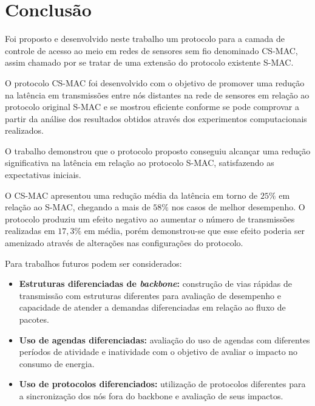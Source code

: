 \section{Conclusão}

Foi proposto e desenvolvido neste trabalho um protocolo para a camada de controle de acesso ao meio em redes de sensores sem fio denominado CS-MAC, assim chamado por se tratar de uma extensão do protocolo existente S-MAC. 

O protocolo CS-MAC foi desenvolvido com o objetivo de promover uma redução na latência em transmissões entre nós distantes na rede de sensores em relação ao protocolo original S-MAC e se mostrou eficiente conforme se pode comprovar a partir da análise dos resultados obtidos através dos experimentos computacionais realizados.

O trabalho demonstrou que o protocolo proposto conseguiu alcançar uma redução significativa na latência em relação ao protocolo S-MAC, satisfazendo as expectativas iniciais.

O CS-MAC apresentou uma redução média da latência em torno de  $25\%$ em relação ao S-MAC, chegando a mais de $58\%$ nos casos de melhor desempenho. O protocolo produziu um efeito negativo ao aumentar o número de transmissões realizadas em $17,3\%$ em média, porém demonstrou-se que esse efeito poderia ser amenizado através de alterações nas configurações do protocolo.

Para trabalhos futuros podem ser considerados:

\begin{itemize}

\item \textbf{Estruturas diferenciadas de \emph{backbone}:} construção de vias rápidas de transmissão com estruturas diferentes para avaliação de desempenho e capacidade de atender a demandas diferenciadas em relação ao fluxo de pacotes.

\item \textbf{Uso de agendas diferenciadas:} avaliação do uso de agendas com diferentes períodos de atividade e inatividade com o objetivo de avaliar o impacto no consumo de energia.

\item \textbf{Uso de protocolos diferenciados:} utilização de protocolos diferentes para a sincronização dos nós fora do backbone e avaliação de seus impactos.

\end{itemize}